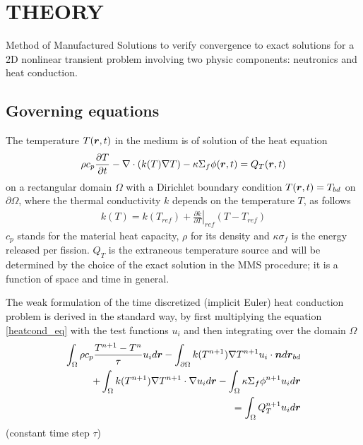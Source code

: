 \section*{THEORY}
\vspace{-4mm}
Method of Manufactured Solutions to verify convergence to exact solutions for a 2D nonlinear transient problem involving two physic components: neutronics and heat conduction.

\subsection*{Governing equations}

The temperature $T(\boldsymbol{r}, t)$ in the medium is of solution of the heat equation 
\begin{align}
  \rho c_p \frac{\partial T}{\partial t} 
  - \nabla\cdot(k(T) \nabla T) 
  - \kappa \Sigma_{f} \phi(\boldsymbol{r},t)
  = Q_T(\boldsymbol{r},t) \label{heatcond_eq}
\end{align}
on a rectangular domain $\Omega$ with a  Dirichlet boundary condition $T(\boldsymbol{r},t) = T_{bd}$ on $\partial\Omega$, where the thermal conductivity $k$ depends on the temperature $T$, as follows
\begin{align}
  k(T) = k(T_{ref}) + \left. \frac{\partial k}{\partial T}\right|_{ref} \left( T - T_{ref} \right)
\end{align}
%
$c_p$ stands for the material heat capacity, $\rho$ for its density and $\kappa \sigma_{f}$ is the energy released per fission.  $Q_T$ is the extraneous temperature source and will be determined by the choice of the exact solution in the MMS procedure; it is a function of space and time in general.

The weak formulation of the time discretized (implicit Euler) heat conduction problem is derived in the standard way, by first multiplying the equation \eqref{heatcond_eq} with the test functions $u_{i}$ and then integrating over the domain $\Omega$
\begin{align}
  \int_{\Omega} \rho c_p \frac{T^{n+1}-T{^n}}{\tau} u_i d\boldsymbol{r} 
  - \int_{\partial\Omega} k(T^{n+1}) \nabla T^{n+1} u_i \cdot \boldsymbol{n} d\boldsymbol{r}_{bd}&  \nonumber \\
  + \int_{\Omega} k(T^{n+1}) \nabla T^{n+1} \cdot \nabla u_i d\boldsymbol{r}
  - \int_{\Omega} \kappa \Sigma_{f} \phi^{n+1} u_i d\boldsymbol{r}& \nonumber \\
  = \int_{\Omega} Q_T^{n+1} u_i d\boldsymbol{r}& \label{heatcond_wf}
\end{align}
(constant time step $\tau$)

